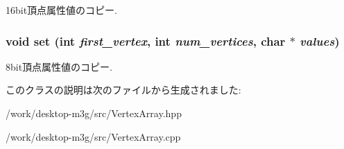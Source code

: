 16bit頂点属性値のコピー. \hypertarget{classm3g_1_1VertexArray_501a9e6d9b5190b0a9dbfe58a6fd9d2e}{
\subsubsection[{set}]{\setlength{\rightskip}{0pt plus 5cm}void set (int {\em first\_\-vertex}, \/  int {\em num\_\-vertices}, \/  char $\ast$ {\em values})}}
\label{classm3g_1_1VertexArray_501a9e6d9b5190b0a9dbfe58a6fd9d2e}


8bit頂点属性値のコピー. 

このクラスの説明は次のファイルから生成されました:\begin{CompactItemize}
\item 
/work/desktop-m3g/src/VertexArray.hpp\item 
/work/desktop-m3g/src/VertexArray.cpp\end{CompactItemize}

